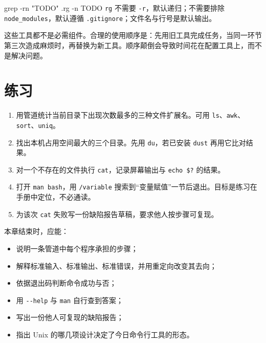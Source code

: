 \begin{toolswap}{grep -rn "TODO" .}{rg -n TODO}
\texttt{rg} 不需要 \texttt{-r}，默认递归；不需要排除 \texttt{node\_modules}，默认遵循 \texttt{.gitignore}；文件名与行号是默认输出。
\end{toolswap}

这些工具都不是必需组件。合理的使用顺序是：先用旧工具完成任务，当同一环节第三次造成麻烦时，再替换为新工具。顺序颠倒会导致时间花在配置工具上，而不是解决问题。

\section{练习}

\begin{enumerate}
  \item 用管道统计当前目录下出现次数最多的三种文件扩展名。可用 \texttt{ls}、\texttt{awk}、\texttt{sort}、\texttt{uniq}。
  \item 找出本机占用空间最大的三个目录。先用 \texttt{du}，若已安装 \texttt{dust} 再用它比对结果。
  \item 对一个不存在的文件执行 \texttt{cat}，记录屏幕输出与 \texttt{echo \$?} 的结果。
  \item 打开 \texttt{man bash}，用 \texttt{/variable} 搜索到“变量赋值”一节后退出。目标是练习在手册中定位，不必通读。
  \item 为该次 \texttt{cat} 失败写一份缺陷报告草稿，要求他人按步骤可复现。
\end{enumerate}

\begin{checkpoint}
本章结束时，应能：
\begin{itemize}
  \item 说明一条管道中每个程序承担的步骤；
  \item 解释标准输入、标准输出、标准错误，并用重定向改变其去向；
  \item 依据退出码判断命令成功与否；
  \item 用 \texttt{-{}-help} 与 \texttt{man} 自行查到答案；
  \item 写出一份他人可复现的缺陷报告；
  \item 指出 Unix 的哪几项设计决定了今日命令行工具的形态。
\end{itemize}
\end{checkpoint}
